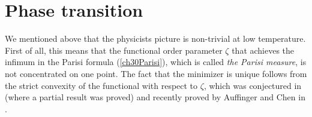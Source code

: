 \documentclass[12pt]{article}
\theoremstyle{nonumberplain}
\begin{document}

\section{Phase transition}\label{SecLabel-PT}

We mentioned above that the physicists picture is non-trivial at low temperature. First of all, this means that the functional order parameter $\zeta$ that achieves the infimum in the Parisi formula (\ref{ch30Parisi}), which is called \emph{the Parisi measure}, is not concentrated on one point. The fact that the minimizer is unique follows from the strict convexity of the functional with respect to $\zeta$, which was conjectured in \cite{PConvex} (where a partial result was proved) and recently proved by Auffinger and Chen in \cite{AufChen2}. 
\end{document}
